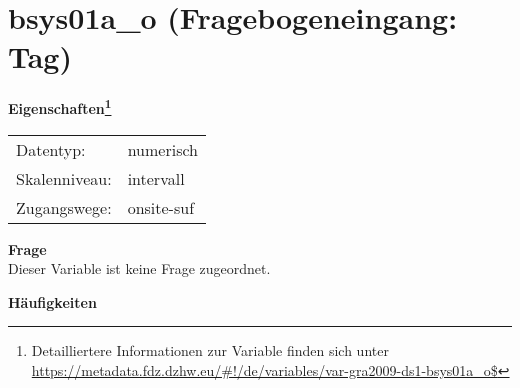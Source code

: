 
    \setcounter{footnote}{0}

    \vspace*{-1.8cm}
	\section{bsys01a\_o (Fragebogeneingang: Tag)}
	\label{section:bsys01a_o}



    \vspace*{0.5cm}
    \noindent\textbf{Eigenschaften\footnote{Detailliertere Informationen zur Variable finden sich unter
		\url{https://metadata.fdz.dzhw.eu/\#!/de/variables/var-gra2009-ds1-bsys01a_o$}}}\\
	\begin{tabularx}{\hsize}{@{}lX}
	Datentyp: & numerisch \\
	Skalenniveau: & intervall \\
	Zugangswege: &
	  onsite-suf
 \\
    \end{tabularx}



		\vspace*{0.5cm}
		\noindent\textbf{Frage}\\
		Dieser Variable ist keine Frage zugeordnet.





        		\vspace*{0.5cm}
                \noindent\textbf{Häufigkeiten}

